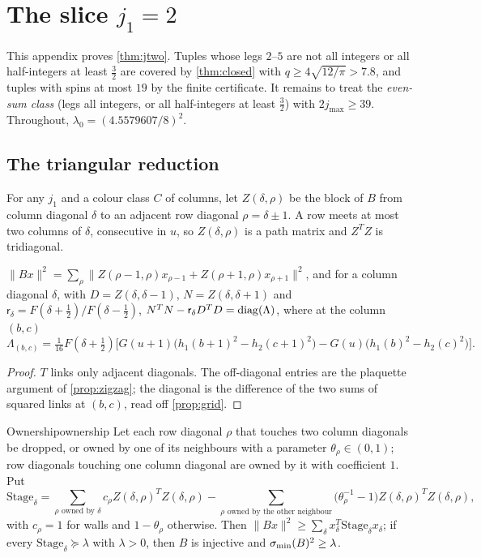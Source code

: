 \section{The slice \texorpdfstring{$j_1=2$}{j1 = 2}}\label{app:jtwo}

This appendix proves \cref{thm:jtwo}. Tuples whose legs $2$--$5$ are not all integers or all
half-integers at least $\frac32$ are covered by \cref{thm:closed} with $q\ge4\sqrt{12/\pi}>7.8$,
and tuples with spins at most $19$ by the finite certificate. It remains to treat the
\emph{even-sum class} (legs all integers, or all half-integers at least $\frac32$) with
$2j_{\max}\ge39$. Throughout, $\lambda_0=(4.5579607/8)^2$.

\subsection{The triangular reduction}

For any $j_1$ and a colour class $C$ of columns, let $Z(\delta,\rho)$ be the block of $B$
from column diagonal $\delta$ to an adjacent row diagonal $\rho=\delta\pm1$. A row meets at
most two columns of $\delta$, consecutive in $u$, so $Z(\delta,\rho)$ is a path matrix and
$Z^TZ$ is tridiagonal.

\begin{lemma}\label{lem:rowdiag}
$\|Bx\|^2=\sum_\rho\|Z(\rho-1,\rho)x_{\rho-1}+Z(\rho+1,\rho)x_{\rho+1}\|^2$, and for a column
diagonal $\delta$, with $D=Z(\delta,\delta-1)$, $N=Z(\delta,\delta+1)$ and
$\mathsf r_\delta=F(\delta+\frac12)/F(\delta-\frac12)$,
$N^TN-\mathsf r_\delta D^TD=\operatorname{diag}(\Lambda)$, where at the column $(b,c)$
\[
  \Lambda_{(b,c)}=\tfrac{1}{16}F(\delta+\tfrac12)\bigl[G(u+1)\bigl(h_1(b+1)^2-h_2(c+1)^2\bigr)
  -G(u)\bigl(h_1(b)^2-h_2(c)^2\bigr)\bigr].
\]
\end{lemma}

\begin{proof}
$T$ links only adjacent diagonals. The off-diagonal entries are the plaquette argument of
\cref{prop:zigzag}; the diagonal is the difference of the two sums of squared links at
$(b,c)$, read off \cref{prop:grid}.
\end{proof}
\enlargethispage{-2\baselineskip}%

\begin{theorem}{Ownership}{ownership}
Let each row diagonal $\rho$ that touches two column diagonals be dropped, or owned by one of
its neighbours with a parameter $\theta_\rho\in(0,1)$; row diagonals touching one column diagonal
are owned by it with coefficient $1$. Put
\[
  \mathrm{Stage}_\delta=\sum_{\rho\text{ owned by }\delta}c_\rho Z(\delta,\rho)^TZ(\delta,\rho)
  -\sum_{\rho\text{ owned by the other neighbour}}\bigl(\theta_\rho^{-1}-1\bigr)Z(\delta,\rho)^TZ(\delta,\rho),
\]
with $c_\rho=1$ for walls and $1-\theta_\rho$ otherwise. Then $\|Bx\|^2\ge\sum_\delta x_\delta^T
\mathrm{Stage}_\delta x_\delta$; if every $\mathrm{Stage}_\delta\succeq\lambda$ with $\lambda>0$, then $B$ is
injective and $\sigma_{\min}(B)^2\ge\lambda$.
\end{theorem}

